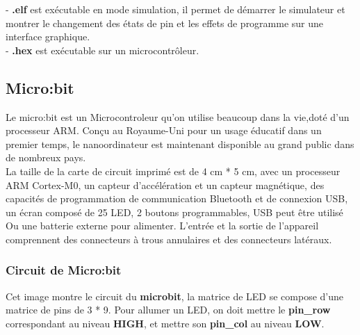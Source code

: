 \documentclass[14px]{article}
\begin{document}
- \textbf{.elf} est exécutable en mode simulation, il permet de démarrer le simulateur et montrer le changement des états de pin et les effets de programme sur une interface graphique.\\
- \textbf{.hex} est exécutable sur un microcontrôleur.


\pagestyle{fancy}
\rhead{\thepage}
\fancyfoot{}
\subsection{Micro:bit}
Le micro:bit est un Microcontroleur qu'on utilise beaucoup dans la vie,doté d'un processeur ARM. Conçu au Royaume-Uni pour un usage éducatif dans un premier temps, le nanoordinateur est maintenant disponible au grand public dans de nombreux pays.\\

La taille de la carte de circuit imprimé est de 4 cm * 5 cm, avec un processeur ARM Cortex-M0, un capteur d'accélération et un capteur magnétique, des capacités de programmation de communication Bluetooth et de connexion USB, un écran composé de 25 LED, 2 boutons programmables, USB peut être utilisé Ou une batterie externe pour alimenter. L'entrée et la sortie de l'appareil comprennent des connecteurs à trous annulaires et des connecteurs latéraux.

\subsubsection{Circuit de Micro:bit}
Cet image montre le circuit du \textbf{microbit}, la matrice de LED se compose d'une matrice de pins de 3 * 9. Pour allumer un LED, on doit mettre le \textbf{pin\_row} correspondant au niveau \textbf{HIGH}, et mettre son \textbf{pin\_col} au niveau \textbf{LOW}.

\begin{figure1}[h]
\end{figure1}
\end{document}
